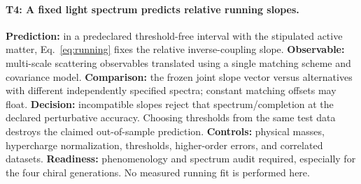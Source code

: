 \paragraph{T4: A fixed light spectrum predicts relative running slopes.}
\textbf{Prediction:} in a predeclared threshold-free interval with the stipulated active matter, Eq.~\eqref{eq:running} fixes the relative inverse-coupling slope. \textbf{Observable:} multi-scale scattering observables translated using a single matching scheme and covariance model. \textbf{Comparison:} the frozen joint slope vector versus alternatives with different independently specified spectra; constant matching offsets may float. \textbf{Decision:} incompatible slopes reject that spectrum/completion at the declared perturbative accuracy. Choosing thresholds from the same test data destroys the claimed out-of-sample prediction. \textbf{Controls:} physical masses, hypercharge normalization, thresholds, higher-order errors, and correlated datasets. \textbf{Readiness:} phenomenology and spectrum audit required, especially for the four chiral generations. No measured running fit is performed here.

